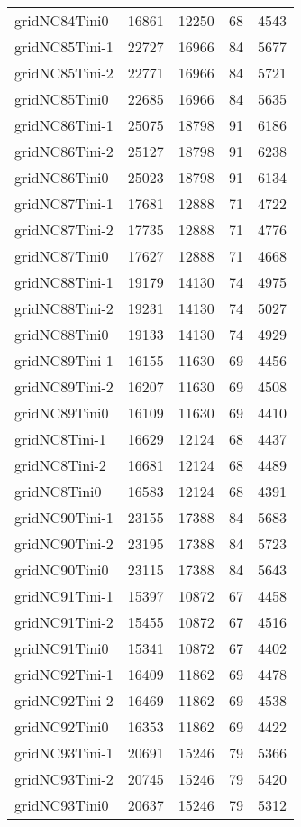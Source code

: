 \begin{tabular}{lrrrr}
gridNC84Tini0 & 16861 & 12250 & 68 & 4543 \\
gridNC85Tini-1 & 22727 & 16966 & 84 & 5677 \\
gridNC85Tini-2 & 22771 & 16966 & 84 & 5721 \\
gridNC85Tini0 & 22685 & 16966 & 84 & 5635 \\
gridNC86Tini-1 & 25075 & 18798 & 91 & 6186 \\
gridNC86Tini-2 & 25127 & 18798 & 91 & 6238 \\
gridNC86Tini0 & 25023 & 18798 & 91 & 6134 \\
gridNC87Tini-1 & 17681 & 12888 & 71 & 4722 \\
gridNC87Tini-2 & 17735 & 12888 & 71 & 4776 \\
gridNC87Tini0 & 17627 & 12888 & 71 & 4668 \\
gridNC88Tini-1 & 19179 & 14130 & 74 & 4975 \\
gridNC88Tini-2 & 19231 & 14130 & 74 & 5027 \\
gridNC88Tini0 & 19133 & 14130 & 74 & 4929 \\
gridNC89Tini-1 & 16155 & 11630 & 69 & 4456 \\
gridNC89Tini-2 & 16207 & 11630 & 69 & 4508 \\
gridNC89Tini0 & 16109 & 11630 & 69 & 4410 \\
gridNC8Tini-1 & 16629 & 12124 & 68 & 4437 \\
gridNC8Tini-2 & 16681 & 12124 & 68 & 4489 \\
gridNC8Tini0 & 16583 & 12124 & 68 & 4391 \\
gridNC90Tini-1 & 23155 & 17388 & 84 & 5683 \\
gridNC90Tini-2 & 23195 & 17388 & 84 & 5723 \\
gridNC90Tini0 & 23115 & 17388 & 84 & 5643 \\
gridNC91Tini-1 & 15397 & 10872 & 67 & 4458 \\
gridNC91Tini-2 & 15455 & 10872 & 67 & 4516 \\
gridNC91Tini0 & 15341 & 10872 & 67 & 4402 \\
gridNC92Tini-1 & 16409 & 11862 & 69 & 4478 \\
gridNC92Tini-2 & 16469 & 11862 & 69 & 4538 \\
gridNC92Tini0 & 16353 & 11862 & 69 & 4422 \\
gridNC93Tini-1 & 20691 & 15246 & 79 & 5366 \\
gridNC93Tini-2 & 20745 & 15246 & 79 & 5420 \\
gridNC93Tini0 & 20637 & 15246 & 79 & 5312 \\

\end{tabular}
